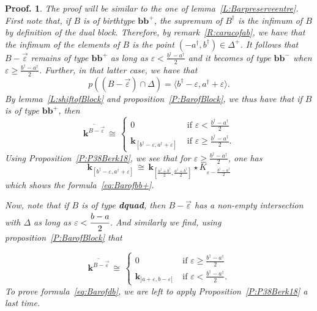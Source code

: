 \documentclass[a4paper, english, 11pt]{article}
\newcommand{\kk}[0]{\textbf{k}}
\newcommand{\0}{\vec{0}}
\newtheorem*{pf}{Proof.} }
\begin{document}
\begin{pf}The proof will be similar to the one of lemma~\ref{L:Barpreserveentre}. First note that,  if $B$ is of birthtype $\textbf{bb}^+$, the supremum of $B^\dagger$ is the infimum of $B$ by definition of the dual block. Therefore, by remark~\ref{R:caracofab}, we have that the infimum of the elements of $B$ is the point $(-a^\dagger, b^\dagger)\in \Delta^+$. 
It follows that $B-\vec{\varepsilon}$ remains of type $\textbf{bb}^+$ as long as $\varepsilon < \frac{b^\dagger-a^\dagger}{2}$ and it becomes of type $\textbf{bb}^{-}$ when  $\varepsilon \geqslant \frac{b^\dagger-a^\dagger}{2}$. Further, in that latter case, we have that 
$$ p((B-\vec{\varepsilon})\cap \Delta) = \langle b^\dagger  -\varepsilon,  a^\dagger + \varepsilon \rangle.  $$
By lemma~\ref{L:shiftofBlock} and proposition~\ref{P:BarofBlock}, we thus have that {if $B$ is of type $\textbf{bb}^{+}$, then }
 \[
   \overline{\kk^{B-\vec{\varepsilon}}} 
 \, \cong \, \left\{ \begin{array}{ll}  0 & \mbox{ if $\varepsilon< \frac{b^\dagger-a^\dagger}{2}$}\\
 \kk_{[b^\dagger  -\varepsilon,  a^\dagger + \varepsilon]}& \mbox{ if $\varepsilon \geqslant \frac{b^\dagger-a^\dagger}{2}$.} \end{array}                                                                                                                          \right . \]
 Using Proposition~\ref{P:P38Berk18}, we see that for  $\varepsilon \geqslant \frac{b^\dagger-a^\dagger}{2}$, one has $$\kk_{[b^\dagger  -\varepsilon,  a^\dagger + \varepsilon]} 
 \, \cong \,\kk_{[\frac{a^\dagger+b^\dagger}{2}, \frac{a^\dagger+b^\dagger}{2}]}\star K_{\varepsilon -\frac{b^\dagger -a^\dagger}{2}} $$
 which shows the formula~\eqref{eq:Barofbb+}. 
 
 Now, note that if $B$ is of type \textbf{dquad}, then $B-\vec{\varepsilon}$ has a non-empty intersection with $\Delta$ as long as $\varepsilon < \cfrac{b-a}{2}$. And similarly we find, using proposition~\ref{P:BarofBlock} that 
 
 \[
  \overline{\kk^{B-\vec{\varepsilon}}} 
 \, \cong \,\left\{ \begin{array}{ll}  0 & \mbox{ if $\varepsilon \geq \frac{b^\dagger-a^\dagger}{2}$} \\  \kk_{]a+\varepsilon, b-\varepsilon [}  & \mbox{ if $\varepsilon < \frac{b^\dagger-a^\dagger}{2}$}.\end{array}                                                                                                                          \right . \]
 To prove formula~\eqref{eq:Barofdb}, we are left to apply  Proposition~\ref{P:P38Berk18} a last time.
\end{pf}
\end{document}
